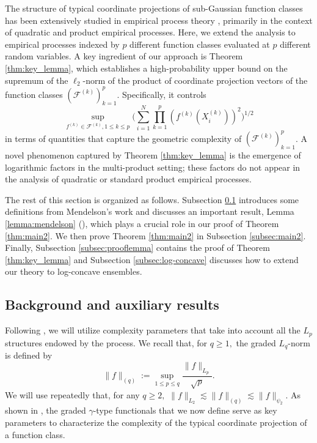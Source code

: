 \documentclass[numbers,webpdf,imaiai]{ima-authoring-template}
\theoremstyle{thmstyletwo}%
\numberwithin{equation}{section}
\numberwithin{equation}{section}
\newcommand{\F}{\mathcal{F}}
\begin{document}
The structure of typical coordinate projections of sub-Gaussian function classes has been extensively studied in empirical process theory \cite{mendelson2010empirical, mendelson2011discrepancy,mendelson2012generic,mendelson2016dvoretzky,mendelson2016upper}, primarily in the context of quadratic and product empirical processes. Here, we extend the analysis to empirical processes indexed by $p$ different function classes evaluated at $p$ different random variables. A key ingredient of our approach is Theorem \ref{thm:key_lemma}, which establishes a high-probability upper bound on the supremum of the $\ell_2$-norm of the product of coordinate projection vectors of the function classes $(\F^{(k)})_{k=1}^{p}$. Specifically, it controls
\[
\sup_{f^{(k)}\in \F^{(k)},1\le k\le p} \bigg(\sum_{i=1}^{N}\prod_{k=1}^{p} \left(f^{(k)}(X_i^{(k)})\right)^2\bigg)^{1/2}
\]
in terms of quantities that capture the geometric complexity of $(\F^{(k)})_{k=1}^{p}$. A novel phenomenon captured by Theorem \ref{thm:key_lemma} is the emergence of logarithmic factors in the multi-product setting; these factors do not appear in the analysis of quadratic or standard product empirical processes.

The rest of this section is organized as follows. Subsection \ref{subsec:background} introduces some definitions from Mendelson's work \cite{mendelson2016upper} and discusses an important result, Lemma \ref{lemma:mendelson} (\cite[Corollary 3.6]{mendelson2016upper}), which plays a crucial role in our proof of Theorem \ref{thm:main2}. We then prove Theorem \ref{thm:main2} in Subsection \ref{subsec:main2}. Finally, Subsection \ref{subsec:prooflemma} contains the proof of Theorem \ref{thm:key_lemma} and Subsection \ref{subsec:log-concave} discusses how to extend our theory to log-concave ensembles. 

\subsection{Background and auxiliary results}\label{subsec:background}
Following \cite{mendelson2016upper}, we will utilize complexity parameters that take into account all the $L_p$ structures endowed by the process. We recall that, for $q \geq 1,$ the graded $L_q$-norm is defined by
\[
\|f\|_{(q)} :=\sup _{1 \leq p \leq q} \frac{\|f\|_{L_p}}{\sqrt{p}}.
\]
We will use repeatedly that, for any $q \ge 2,$ $\|f \|_{L_2} \lesssim \|f\|_{(q)} \lesssim \|f\|_{\psi_2}.$
As shown in \cite{mendelson2016upper}, the graded $\gamma$-type functionals that we now define serve as key parameters to characterize the complexity of the typical coordinate projection of a function class.
 
\end{document}
